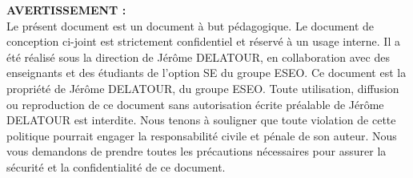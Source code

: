 \noindent %
\textbf{AVERTISSEMENT :} %
\vspace{3mm} \\
Le présent document est un document à but pédagogique.  
Le document de conception ci-joint est strictement confidentiel et réservé à un usage interne. 
Il a été réalisé sous la direction de Jérôme DELATOUR, en collaboration avec des enseignants 
et des étudiants de l'option SE du groupe ESEO. Ce document est la propriété de Jérôme DELATOUR, du groupe ESEO.
Toute utilisation, diffusion ou reproduction de ce document sans autorisation écrite préalable de Jérôme DELATOUR est interdite. 
Nous tenons à souligner que toute violation de cette politique pourrait engager la responsabilité civile et pénale de son auteur. 
Nous vous demandons de prendre toutes les précautions nécessaires pour assurer la sécurité et la confidentialité de ce document.